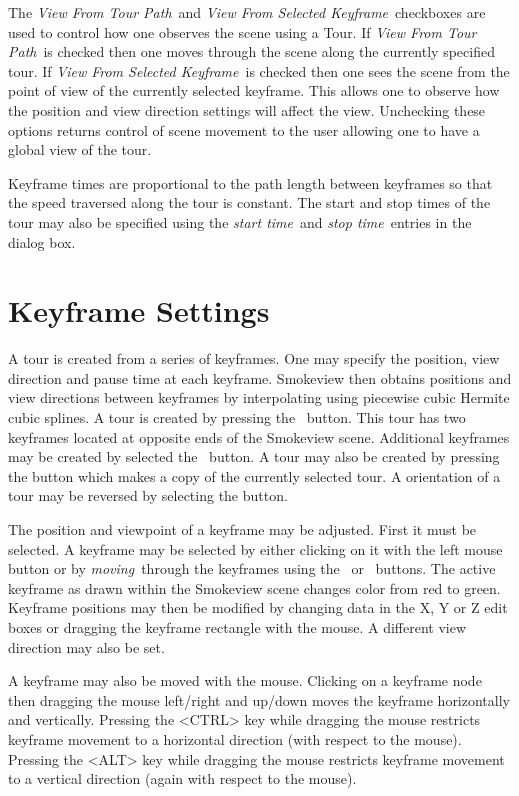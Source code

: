 \documentclass[11pt,twoside]{book}
\newcommand{\frameit}[1]{\fbox{\tt #1}}
\begin{document}
The {\em View From Tour Path}\ and  {\em
View From Selected Keyframe}\ checkboxes are used to control how one observes the
scene using a Tour.  If {\em View From Tour Path}\ is checked then one moves through the
scene along the currently specified tour.  If {\em
View From Selected Keyframe}\ is checked then one sees the scene from the point of view of the
currently selected keyframe.  This allows one to observe how
the position and view direction settings will affect the view.  Unchecking these options
returns control of scene movement to the user allowing one to have a global view of the tour.

Keyframe times are  proportional to the path length
between keyframes so that the speed traversed along the tour is constant.
The start and stop times of the tour may also be specified using the {\em start time}\ and
{\em stop time}\ entries in the dialog box.


\section{Keyframe Settings}
A tour is created from a series of keyframes.  One may specify
 the position, view direction and pause time at each keyframe.  Smokeview then
obtains positions and view directions between keyframes by interpolating
using piecewise cubic Hermite cubic splines.
A tour is created by pressing the
\frameit{Add Tour}\ button.  This tour has two keyframes located
at opposite ends of the Smokeview scene.  Additional keyframes may
be created by selected the \frameit{Add}\ button. A tour may also be
created by pressing the \frameit{Copy} button which makes a copy of the
currently selected tour.  A orientation of a tour may be reversed by selecting
the \frameit{Reverse} button.

The position and viewpoint of a keyframe may be adjusted.  First
it must be selected.  A keyframe may be selected by either
clicking on it with the left mouse button or by {\em moving}\ through
the keyframes using the \frameit{Next}\ or \frameit{Previous}\
buttons. The active keyframe as drawn within the Smokeview scene changes color from red to green.
Keyframe positions may then be modified by changing
data in the X, Y or Z edit boxes or dragging the keyframe rectangle with the mouse.  A different view direction
may also be set.

A keyframe may also be moved with the mouse.  Clicking on a
keyframe node then dragging the mouse left/right and up/down
moves the keyframe horizontally and vertically.  Pressing the
<CTRL> key while dragging the mouse
restricts keyframe movement to a horizontal direction (with respect to the mouse).
Pressing the <ALT> key while dragging the mouse
restricts keyframe movement to a vertical direction (again with respect to the mouse).
\end{document}
